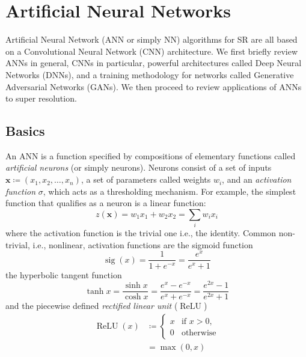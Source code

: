 \section{Artificial Neural Networks}\label{sec:neural-networks}

\localtableofcontents
Artificial Neural Network (ANN or simply NN) algorithms for SR are all based on a Convolutional Neural Network (CNN) architecture.
%
We first briefly review ANNs in general, CNNs in particular, powerful architectures called Deep Neural Networks (DNNs), and a training methodology for networks called Generative Adversarial Networks (GANs).
%
We then proceed to review applications of ANNs to super resolution.
%
\subsection{Basics}

An ANN is a function specified by compositions of elementary functions called \textit{artificial neurons} (or simply neurons).
%
Neurons consist of a set of inputs \(\mathbf{x} \coloneqq (x_1, x_2, \dots, x_n)\), a set of parameters called weights \(w_i\), and an \textit{activation function} \(\sigma\), which acts as a thresholding mechanism.
%
For example, the simplest function that qualifies as a neuron is a linear function:
\begin{equation}
    z(\mathbf{x}) = w_1 x_1 + w_2 x_2 = \sum_i w_i x_i
    \label{eqn:simpleann}
\end{equation}
where the activation function is the trivial one i.e., the identity.
%
Common non-trivial, i.e., nonlinear, activation functions are the sigmoid function
\begin{equation}
    \operatorname{sig}(x)={\frac {1}{1+e^{-x}}}={\frac {e^{x}}{e^{x}+1}}
\end{equation}
the hyperbolic tangent function
\begin{equation}
    \tanh x={\frac {\sinh x}{\cosh x}}={\frac {e^{x}-e^{-x}}{e^{x}+e^{-x}}}={\frac {e^{2x}-1}{e^{2x}+1}}
\end{equation}
and the piecewise defined \textit{rectified linear unit} (\(\operatorname{ReLU}\))
\begin{align}
    \operatorname{ReLU}(x) & \coloneqq \begin{cases}x&{\text{if }}x>0,\\0&{\text{otherwise}}\end{cases} \\
                           & = \max(0, x)
\end{align}
